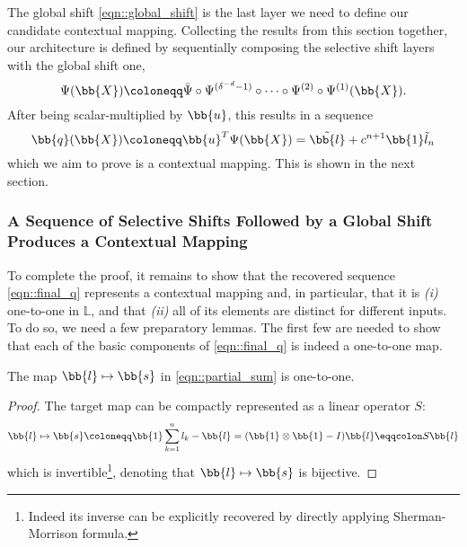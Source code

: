 The global shift \cref{eqn::global_shift} is the last layer we need to define our candidate contextual mapping. Collecting the results from this section together, our architecture is defined by sequentially composing the selective shift layers with the global shift one,
\begin{equation}
    \Psi(\bb{X}) \coloneqq \bar{\Psi}\circ\Psi^{(\delta^{-d}-1)}\circ\cdots\circ\Psi^{(2)}\circ\Psi^{(1)}(\bb{X}).
\end{equation}
After being scalar-multiplied by $\bb{u}$, this results in a sequence
\begin{equation}
    \bb{q}(\bb{X}) \coloneqq \bb{u}^T\Psi(\bb{X}) = \tilde{\bb{l}} + c^{n+1} \bb{1}\tilde{l}_n
    \label{eqn::final_q}
\end{equation}
which we aim to prove is a contextual mapping. This is shown in the next section.






\subsubsection{A Sequence of Selective Shifts Followed by a Global Shift Produces a Contextual Mapping}
\label{sec::proof_contextual_mapping}
To complete the proof, it remains to show that the recovered sequence \cref{eqn::final_q} represents a contextual mapping and, in particular, that it is \emph{(i)} one-to-one in $\mathbb{L}$, and that \emph{(ii)} all of its elements are distinct for different inputs. To do so, we need a few preparatory lemmas. The first few are needed to show that each of the basic components of \cref{eqn::final_q} is indeed a one-to-one map.


\begin{lemma}
\label{thm::S_1to1}
The map $\bb{l}\mapsto\bb{s}$ in \cref{eqn::partial_sum} is one-to-one.
\end{lemma}
\begin{proof}
The target map can be compactly represented as a linear operator $S$:
\begin{equation}
    \bb{l}\mapsto \bb{s}\coloneqq \bb{1}\sum_{k=1}^n l_k - \bb{l} = (\bb{1}\otimes\bb{1} - I)\bb{l}\eqqcolon S\bb{l}
    \label{eqn::s_as_linear_op}
\end{equation}
which is invertible\footnote{Indeed its inverse can be explicitly recovered by directly applying Sherman-Morrison formula.}, denoting that $\bb{l}\mapsto\bb{s}$ is bijective.
\end{proof}


